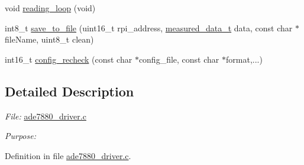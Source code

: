 {\bf }\par
\begin{DoxyCompactItemize}
\item 
void \hyperlink{a00003_gaeb3af492d3421787fcbb2cd1bbbaf62c}{reading\-\_\-loop} (void)
\begin{DoxyCompactList}\small\item\em 

 \end{DoxyCompactList}\end{DoxyCompactItemize}

{\bf }\par
\begin{DoxyCompactItemize}
\item 
int8\-\_\-t \hyperlink{a00003_ga9e259879c5d746107c4a70fe08aba924}{save\-\_\-to\-\_\-file} (uint16\-\_\-t rpi\-\_\-address, \hyperlink{a00029}{measured\-\_\-data\-\_\-t} data, const char $\ast$file\-Name, uint8\-\_\-t clean)
\begin{DoxyCompactList}\small\item\em 

 \end{DoxyCompactList}\end{DoxyCompactItemize}

{\bf }\par
\begin{DoxyCompactItemize}
\item 
int16\-\_\-t \hyperlink{a00003_gac93e16d1e9d6a04b52373bf3428cc79c}{config\-\_\-recheck} (const char $\ast$config\-\_\-file, const char $\ast$format,...)
\begin{DoxyCompactList}\small\item\em 

 \end{DoxyCompactList}\end{DoxyCompactItemize}



\subsection{Detailed Description}
{\itshape File\-:} \hyperlink{a00035}{ade7880\-\_\-driver.\-c} \par
 {\itshape Purpose\-:} \par
 

Definition in file \hyperlink{a00035_source}{ade7880\-\_\-driver.\-c}.

